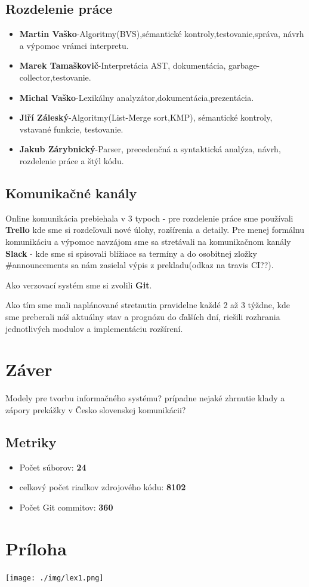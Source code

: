 \documentclass[12pt,a4paper]{report}
\begin{document}
\section{Rozdelenie práce}
\begin{itemize}
\item \textbf{Martin Vaško}-Algoritmy(BVS),sémantické kontroly,testovanie,správa, návrh a výpomoc vrámci interpretu.
\item \textbf{Marek Tamaškovič}-Interpretácia AST, dokumentácia, garbage-collector,testovanie.
\item \textbf{Michal Vaško}-Lexikálny analyzátor,dokumentácia,prezentácia.
\item \textbf{Jiří Záleský}-Algoritmy(List-Merge sort,KMP), sémantické kontroly, vstavané funkcie, testovanie.
\item \textbf{Jakub Zárybnický}-Parser, precedenčná a syntaktická analýza, návrh, rozdelenie práce a štýl kódu.
\end{itemize}

\section{Komunikačné kanály}
\par Online komunikácia prebiehala v 3 typoch - pre rozdelenie práce sme používali \textbf{Trello} kde sme si rozdeľovali nové úlohy, rozšírenia a detaily. Pre menej formálnu komunikáciu a výpomoc navzájom sme sa stretávali na komunikačnom kanály \textbf{Slack} - kde sme si spisovali blížiace sa termíny a do osobitnej zložky \#announcements sa nám zasielal výpis z prekladu(odkaz na travis CI??).
\par Ako verzovací systém sme si zvolili \textbf{Git}.
\par Ako tím sme mali naplánované stretnutia pravidelne každé 2 až 3 týždne, kde sme preberali náš aktuálny stav a prognózu do ďalších dní, riešili rozhrania jednotlivých modulov a implementáciu rozšírení.

\chapter{Záver}
Modely pre tvorbu informačného systému? prípadne nejaké zhrnutie klady a zápory prekážky v Česko slovenskej komunikácii?
\section{Metriky}

\begin{itemize}
\item Počet súborov: \textbf{24}
\item celkový počet riadkov zdrojového kódu: \textbf{8102}
\item Počet Git commitov: \textbf{360}
\end{itemize}


\chapter{Príloha}
\texttt{[image: ./img/lex1.png]}\\
\end{document}
